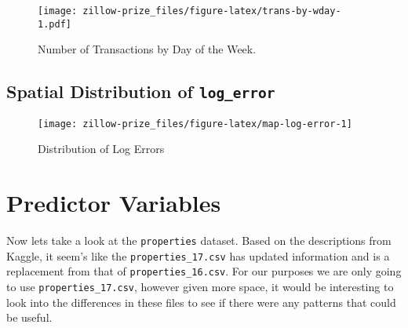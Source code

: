 \documentclass[]{book}
\newenvironment{Shaded}{\begin{snugshade}}{\end{snugshade}}
\newcommand{\KeywordTok}[1]{\textcolor[rgb]{0.13,0.29,0.53}{\textbf{#1}}}
\newcommand{\DataTypeTok}[1]{\textcolor[rgb]{0.13,0.29,0.53}{#1}}
\newcommand{\DecValTok}[1]{\textcolor[rgb]{0.00,0.00,0.81}{#1}}
\newcommand{\FloatTok}[1]{\textcolor[rgb]{0.00,0.00,0.81}{#1}}
\newcommand{\StringTok}[1]{\textcolor[rgb]{0.31,0.60,0.02}{#1}}
\newcommand{\OperatorTok}[1]{\textcolor[rgb]{0.81,0.36,0.00}{\textbf{#1}}}
\newcommand{\NormalTok}[1]{#1}
\theoremstyle{definition}
\theoremstyle{definition}
\theoremstyle{definition}
\theoremstyle{remark}
\begin{document}
\begin{figure}
\centering
\texttt{[image: zillow-prize\_files/figure-latex/trans-by-wday-1.pdf]}
\caption{\label{fig:trans-by-wday}Number of Transactions by Day of the
Week.}
\end{figure}

\subsection{\texorpdfstring{Spatial Distribution of
\texttt{log\_error}}{Spatial Distribution of log\_error}}\label{spatial-distribution-of-log_error}

\begin{Shaded}
\end{Shaded}

\begin{figure}
\texttt{[image: zillow-prize\_files/figure-latex/map-log-error-1]} \caption{Distribution of Log Errors}\label{fig:map-log-error}
\end{figure}

\section{Predictor Variables}\label{predictor-variables}

Now lets take a look at the \texttt{properties} dataset. Based on the
descriptions from Kaggle, it seem's like the \texttt{properties\_17.csv}
has updated information and is a replacement from that of
\texttt{properties\_16.csv}. For our purposes we are only going to use
\texttt{properties\_17.csv}, however given more space, it would be
interesting to look into the differences in these files to see if there
were any patterns that could be useful.
\end{document}

